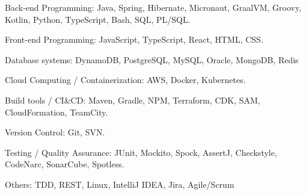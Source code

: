 

\begin{cvskills}


  \cvskill
    {Back-end Programming:} %
    {Java, Spring, Hibernate, Micronaut, GraalVM, Groovy, Kotlin, Python, TypeScript, Bash, SQL, PL/SQL.} %

  \cvskill
    {Front-end Programming:} %
    {JavaScript, TypeScript, React, HTML, CSS.} %

  \cvskill
    {Database systems:} %
    {DynamoDB, PostgreSQL, MySQL, Oracle, MongoDB, Redis} %

  \cvskill
    {Cloud Computing / Containerization:} %
    {AWS, Docker, Kubernetes.} %

  \cvskill
    {Build tools / CI\&CD:} %
    {Maven, Gradle, NPM, Terraform, CDK, SAM, CloudFormation, TeamCity.} %

  \cvskill
    {Version Control:} %
    {Git, SVN.} %

  \cvskill
    {Testing / Quality Assurance:} %
    {JUnit, Mockito, Spock, AssertJ, Checkstyle, CodeNarc, SonarCube, Spotless.} %
    
  \cvskill
    {Others:} %
    {TDD, REST, Linux, IntelliJ IDEA, Jira, Agile/Scrum} %



\end{cvskills}
